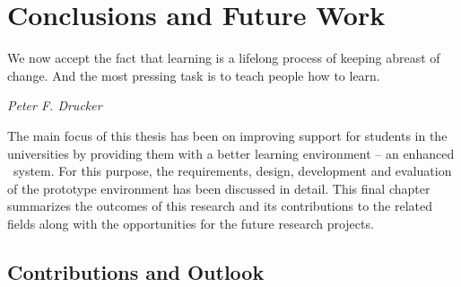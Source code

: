 \chapter{Conclusions and Future Work\label{cha:conclusion}}
\epigraph{We now accept the fact that learning is a lifelong process of keeping
abreast of change. And the most pressing task is to teach people how to
learn.}{\textit{Peter F. Drucker}}
The main focus of this thesis has been on improving \LLLs support for students
in the universities by providing them with a better learning environment -- an
enhanced \ep~system. For this purpose, the requirements, design, development and
evaluation of the prototype environment has been discussed in detail. This final
chapter summarizes the outcomes of this research and its contributions to the
related fields along with the opportunities for the future research projects.

\section{Contributions and Outlook}

